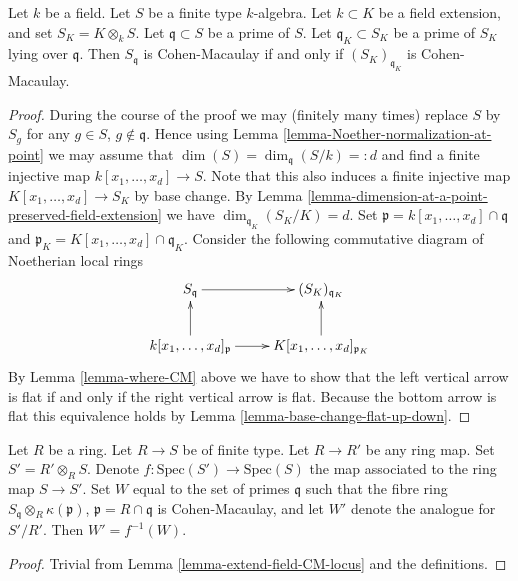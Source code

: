 \begin{lemma}
\label{lemma-extend-field-CM-locus}
Let $k$ be a field. Let $S$ be a finite type $k$-algebra.
Let $k \subset K$ be a field extension, and set $S_K = K\otimes_k S$.
Let $\mathfrak q \subset S$ be a prime of $S$.
Let $\mathfrak q_K \subset S_K$ be a prime of $S_K$ lying
over $\mathfrak q$. Then $S_{\mathfrak q}$ is Cohen-Macaulay
if and only if $(S_K)_{\mathfrak q_K}$ is Cohen-Macaulay.
\end{lemma}

\begin{proof}
During the course of the proof we may (finitely many times) replace
$S$ by $S_g$ for any $g \in S$, $g \not \in \mathfrak q$. Hence
using Lemma \ref{lemma-Noether-normalization-at-point} we may
assume that $\dim(S) = \dim_{\mathfrak q}(S/k) =: d$ and
find a finite injective map $k[x_1, \ldots, x_d] \to S$.
Note that this also induces a finite injective map
$K[x_1, \ldots, x_d] \to S_K$ by base change.
By Lemma \ref{lemma-dimension-at-a-point-preserved-field-extension}
we have $\dim_{\mathfrak q_K}(S_K/K) = d$.
Set $\mathfrak p = k[x_1, \ldots, x_d] \cap \mathfrak q$
and $\mathfrak p_K = K[x_1, \ldots, x_d] \cap \mathfrak q_K$.
Consider the following commutative diagram of Noetherian local
rings
$$
\xymatrix{
S_{\mathfrak q} \ar[r] &
(S_K)_{\mathfrak q_K} \\
k[x_1, \ldots, x_d]_{\mathfrak p} \ar[r] \ar[u] &
K[x_1, \ldots, x_d]_{\mathfrak p_K} \ar[u]
}
$$
By Lemma \ref{lemma-where-CM} above we have to show that
the left vertical arrow is flat if and only if the right
vertical arrow is flat. Because the bottom arrow is flat
this equivalence holds by Lemma \ref{lemma-base-change-flat-up-down}.
\end{proof}

\begin{lemma}
\label{lemma-CM-locus-commutes-base-change}
Let $R$ be a ring. Let $R \to S$ be of finite type.
Let $R \to R'$ be any ring map. Set $S' = R' \otimes_R S$.
Denote $f : \text{Spec}(S') \to \text{Spec}(S)$ the map
associated to the ring map $S \to S'$.
Set $W$ equal to the
set of primes $\mathfrak q$ such that the fibre ring
$S_{\mathfrak q} \otimes_R \kappa(\mathfrak p)$,
$\mathfrak p = R \cap \mathfrak q$ is Cohen-Macaulay,
and let $W'$ denote the analogue for $S'/R'$. Then
$W' = f^{-1}(W)$.
\end{lemma}

\begin{proof}
Trivial from Lemma \ref{lemma-extend-field-CM-locus} and the definitions.
\end{proof}

